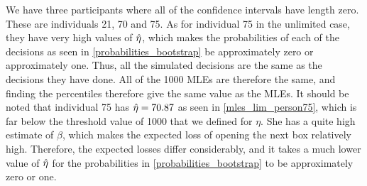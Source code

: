 We have three participants where all of the confidence intervals have length zero. These are individuals 21, 70 and 75. As for individual 75 in the unlimited case, they have very high values of $\hat{\eta}$, which makes the probabilities of each of the decisions as seen in \eqref{probabilities_bootstrap} be approximately zero or approximately one. Thus, all the simulated decisions are the same as the decisions they have done. All of the 1000 MLEs are therefore the same, and finding the percentiles therefore give the same value as the MLEs. It should be noted that individual 75 has $\hat{\eta}=70.87$ as seen in \ref{mles_lim_person75}, which is far below the threshold value of 1000 that we defined for $\eta$. She has a quite high estimate of $\beta$, which makes the expected loss of opening the next box relatively high. Therefore, the expected losses differ considerably, and it takes a much lower value of $\hat{\eta}$ for the probabilities in \eqref{probabilities_bootstrap} to be approximately zero or one. 


